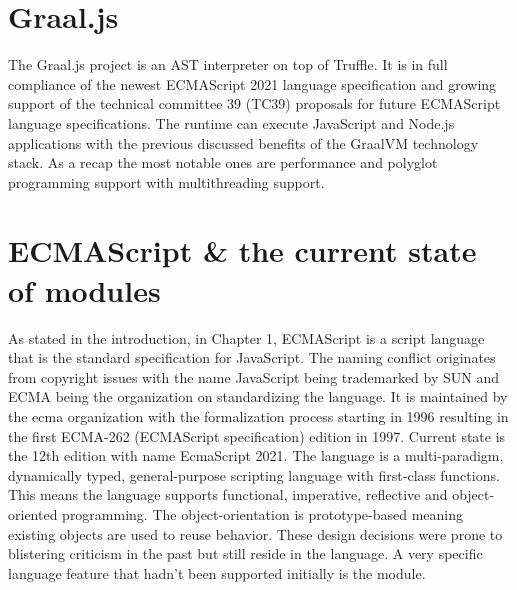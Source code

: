 \section{Graal.js}
The Graal.js project is an AST interpreter on top of Truffle. It is in full compliance of the newest ECMAScript 2021 language specification \cite{kangax1, GraaljsComp} and growing support of the technical committee 39 (TC39) proposals for future ECMAScript language specifications. \cite{kangax2, gitTC}  The runtime can execute JavaScript and Node.js applications with the previous discussed benefits of the GraalVM technology stack. \cite{Graaljs} As a recap the most notable ones are performance and polyglot programming support with multithreading support.

\section{ECMAScript \& the current state of modules}
As stated in the introduction, in Chapter 1, ECMAScript is a script language that is the standard specification for JavaScript. The naming conflict originates from copyright issues with the name JavaScript being trademarked by SUN and ECMA being the organization on standardizing the language. \cite{10.1145/3386327} It is maintained by the ecma organization with the formalization process starting in 1996 resulting in the first ECMA-262 (ECMAScript specification) edition in 1997. Current state is the 12th edition with name EcmaScript 2021. \cite{ecma} The language is a multi-paradigm, dynamically typed, general-purpose scripting language with first-class functions. This means the language supports functional, imperative, reflective and object-oriented programming. The object-orientation is prototype-based meaning existing objects are used to reuse behavior. These design decisions were prone to blistering criticism in the past but still reside in the language. \cite{10.1145/3386327} A very specific language feature that hadn't been supported initially is the module.

